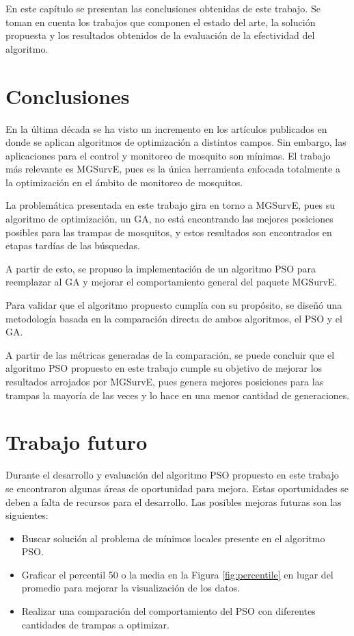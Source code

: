   En este capítulo se presentan las conclusiones obtenidas de este trabajo. 
  Se toman en cuenta los trabajos que componen el estado del arte, la solución
  propuesta y los resultados obtenidos de la evaluación de la efectividad del
  algoritmo.

  \section{Conclusiones}

  En la última década se ha visto un incremento en los artículos publicados
  en donde se aplican algoritmos de optimización a distintos campos. Sin
  embargo, las aplicaciones para el control y monitoreo de mosquito son
  mínimas. El trabajo más relevante es MGSurvE, pues es la única herramienta
  enfocada totalmente a la optimización en el ámbito de monitoreo de
  mosquitos.

  La problemática presentada en este trabajo gira en torno a MGSurvE, pues su
  algoritmo de optimización, un GA, no está encontrando las mejores posiciones
  posibles para las trampas de mosquitos, y estos resultados son encontrados
  en etapas tardías de las búsquedas. 

  A partir de esto, se propuso la implementación de un algoritmo PSO para
  reemplazar al GA y mejorar el comportamiento general del paquete MGSurvE.

  Para validar que el algoritmo propuesto cumplía con su propósito, se diseñó
  una metodología basada en la comparación directa de ambos algoritmos, el PSO
  y el GA.
  
  A partir de las métricas generadas de la comparación, se puede concluir que
  el algoritmo PSO propuesto en este trabajo cumple su objetivo de mejorar
  los resultados arrojados por MGSurvE, pues genera mejores posiciones para
  las trampas la mayoría de las veces y lo hace en una menor cantidad de
  generaciones.

  \section{Trabajo futuro}

  Durante el desarrollo y evaluación del algoritmo PSO propuesto en este
  trabajo se encontraron algunas áreas de oportunidad para mejora. Estas
  oportunidades se deben a falta de recursos para el desarrollo. Las posibles
  mejoras futuras son las siguientes:

  \begin{itemize}
    \item Buscar solución al problema de mínimos locales presente en el
      algoritmo PSO.
    \item Graficar el percentil 50 o la media en la Figura
      \ref{fig:percentile} en lugar del promedio para mejorar la visualización
      de los datos.
    \item Realizar una comparación del comportamiento del PSO con diferentes
      cantidades de trampas a optimizar.
  \end{itemize}    
